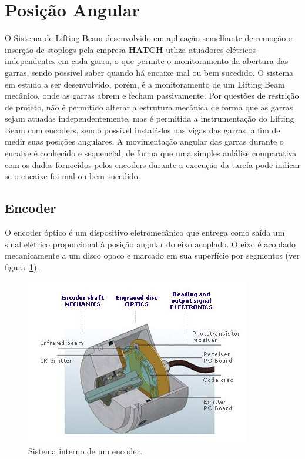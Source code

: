 


\section{Posição Angular}

O Sistema de Lifting Beam desenvolvido em aplicação semelhante de remoção e inserção de stoplogs pela empresa \textbf{HATCH} utliza atuadores elétricos independentes em cada garra, o que permite o monitoramento da abertura das garras, sendo possível saber quando há encaixe mal ou bem sucedido. O sistema em estudo a ser desenvolvido, porém, é a monitoramento de um Lifting Beam mecânico, onde as garras abrem e fecham passivamente. Por questões de restrição de projeto, não é permitido alterar a estrutura mecânica de forma que as garras sejam atuadas independentemente, mas é permitida a instrumentação do Lifting Beam com encoders, sendo possível instalá-los nas vigas das garras, a fim de medir suas posições angulares. A movimentação angular das garras durante o encaixe é conhecido e sequencial, de forma que uma simples anlálise comparativa com os dados fornecidos pelos encoders durante a execução da tarefa pode indicar se o encaixe foi mal ou bem sucedido.

\subsection{Encoder}
O encoder óptico é um dispositivo eletromecânico que entrega como saída um sinal elétrico proporcional à posição angular do eixo acoplado. O eixo é acoplado mecanicamente a um disco opaco e marcado em sua superfície por segmentos (ver figura~\ref{encoder_1}).

\begin{figure}[H]
    \centering
    \includegraphics[width=0.5\columnwidth]{figs/encoder/1.jpg}
    \caption{Sistema interno de um encoder.}
    \label{encoder_1}
\end{figure}

